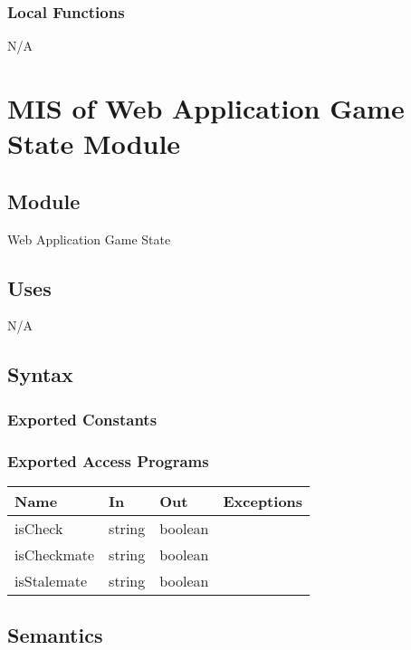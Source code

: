 \documentclass[12pt, titlepage]{article}
\begin{document}
    \subsubsection{Local Functions}
    N/A

    \newpage

\section{MIS of Web Application Game State Module} \label{mGame}

    \subsection{Module}
    Web Application Game State

    \subsection{Uses}
    N/A

    \subsection{Syntax}
    \subsubsection{Exported Constants}

    \subsubsection{Exported Access Programs}
        \begin{center}
        \begin{tabular}{p{3.5cm} p{3cm} p{3cm} p{2.5cm}}
        \hline
        \textbf{Name} & \textbf{In} & \textbf{Out} & \textbf{Exceptions} \\
        \hline
        isCheck & string & boolean & \\
        \hline
        isCheckmate & string & boolean & \\
        \hline
        isStalemate & string & boolean & \\
        \hline
        \end{tabular}
        \end{center}

    \subsection{Semantics}
\end{document}
